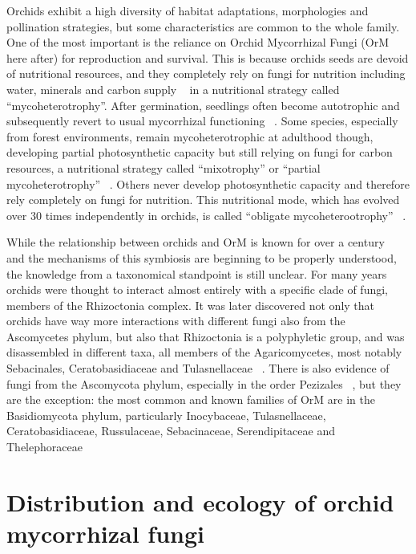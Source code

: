 Orchids exhibit a high diversity of habitat adaptations, morphologies and pollination strategies, but some characteristics are common to the whole family. One of the most important is the reliance on Orchid Mycorrhizal Fungi (OrM here after) for reproduction and survival. This is because orchids seeds are devoid of nutritional resources, and they completely rely on fungi for nutrition including water, minerals and carbon supply ~\citep{leake1994, rasmussen1998, merckx2013} in a nutritional strategy called ``mycoheterotrophy''. After germination, seedlings often become autotrophic and subsequently revert to usual mycorrhizal functioning ~\citep{rasmussen1995, cameron2008}. Some species, especially from forest environments, remain mycoheterotrophic at adulthood though, developing partial photosynthetic capacity but still relying on fungi for carbon resources, a nutritional strategy called ``mixotrophy'' or ``partial mycoheterotrophy'' ~\citep{gebauer2003, julou2005, selosse2009}. Others never develop photosynthetic capacity and therefore rely completely on fungi for nutrition. This nutritional mode, which has evolved over 30 times independently in orchids, is called ``obligate mycoheterootrophy'' ~\citep{merckx2013}.

While the relationship between orchids and OrM is known for over a century ~\citep{bernard1899, rayner1927, rasmussen2002, selosse2011} and the mechanisms of this symbiosis are beginning to be properly understood, the knowledge from a taxonomical standpoint is still unclear. For many years orchids were thought to interact almost entirely with a specific clade of fungi, members of the Rhizoctonia complex. It was later discovered not only that orchids have way more interactions with different fungi also from the Ascomycetes phylum, but also that Rhizoctonia is a polyphyletic group, and was disassembled in different taxa, all members of the Agaricomycetes, most notably Sebacinales, Ceratobasidiaceae and Tulasnellaceae ~\citep{dearnaley2012}.
There is also evidence of fungi from the Ascomycota phylum, especially in the order Pezizales ~\citep{selosse2004, ouanphanivanh2008, waterman2011}, but they are the exception: the most common and known families of OrM are in the Basidiomycota phylum, particularly Inocybaceae, Tulasnellaceae, Ceratobasidiaceae, Russulaceae, Sebacinaceae, Serendipitaceae and Thelephoraceae ~\citep{taylor2004, roy2009, duffy2019}

\section{Distribution and ecology of orchid mycorrhizal fungi}
\label{distributionandecologyoforchidmycorrhizalfungi}

